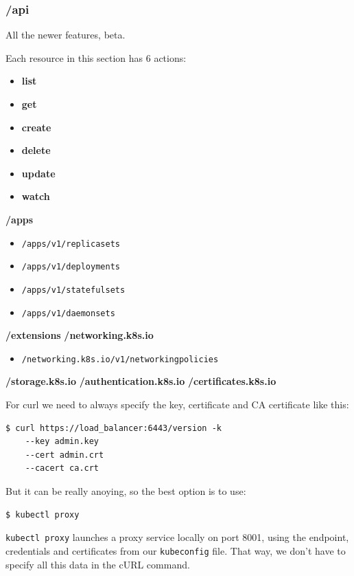 \documentclass{article}
\newenvironment{codetemplate}[1][]{%
  \mybasecolorbox[#1]
  \itshape
}{%
  \endmybasecolorbox
}
\begin{document}
\subsubsection{/api}
All the newer features, beta.

Each resource in this section has 6 actions:
\begin{itemize}
    \item \textbf{list}
    \item \textbf{get}
    \item \textbf{create}
    \item \textbf{delete}
    \item \textbf{update}
    \item \textbf{watch}
\end{itemize}

\textbf{/apps}
\begin{itemize}
    \item \verb|/apps/v1/replicasets|
    \item \verb|/apps/v1/deployments|
    \item \verb|/apps/v1/statefulsets|
    \item \verb|/apps/v1/daemonsets|
\end{itemize}
\textbf{/extensions}
\textbf{/networking.k8s.io}
\begin{itemize}
    \item \verb|/networking.k8s.io/v1/networkingpolicies|
\end{itemize}
\textbf{/storage.k8s.io}
\textbf{/authentication.k8s.io}
\textbf{/certificates.k8s.io}

For curl we need to always specify the key, certificate and CA certificate like this:
\begin{codetemplate}{}
\begin{verbatim}
$ curl https://load_balancer:6443/version -k
    --key admin.key
    --cert admin.crt
    --cacert ca.crt
\end{verbatim}
\end{codetemplate}

But it can be really anoying, so the best option is to use:
\begin{codetemplate}{}
\begin{verbatim}
$ kubectl proxy
\end{verbatim}
\end{codetemplate}

\verb|kubectl proxy| launches a proxy service locally on port 8001, using the endpoint, credentials and certificates
from our \verb|kubeconfig| file. That way, we don't have to specify all this data in the cURL command.
\end{document}
